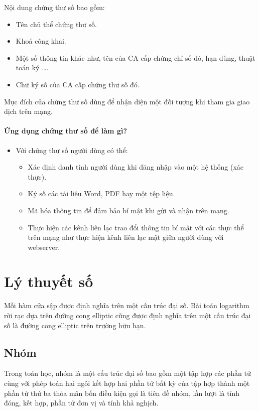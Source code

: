 \documentclass[a4paper,12pt]{report}
\begin{document}
Nội dung chứng thư số bao gồm:
\begin{itemize}
\item Tên chủ thể chứng thư số.
\item Khoá công khai.
\item Một số thông tin khác như, tên của CA cấp chứng chỉ số đó, hạn dùng, thuật toán ký \ldots.
\item Chữ ký số của CA cấp chứng thư số đó.
\end{itemize}

Mục đích của chứng thư số dùng để nhận diện một đối tượng khi tham gia giao dịch trên mạng.

\subsubsection{Ứng dụng chứng thư số để làm gì?}
\begin{itemize}
\item Với chứng thư số người dùng có thể:
\begin{itemize}
\item Xác định danh tính người dùng khi đăng nhập vào một hệ thống (xác thực).
\item Ký số các tài liệu Word, PDF hay một tệp liệu.
\item Mã hóa thông tin để đảm bảo bí mật khi gửi và nhận trên mạng.
\item Thực hiện các kênh liên lạc trao đổi thông tin bí mật với các thực thể trên mạng như thực hiện kênh liên lạc mật giữa người dùng với webserver.
\end{itemize}
\end{itemize}
\chapter{Lý thuyết số}
Mỗi hàm cửa sập được định nghĩa trên một cấu trúc đại số. Bài toán logarithm rời rạc dựa trên đường cong elliptic cũng được định nghĩa trên một cấu trúc đại số là đường cong elliptic trên
trường hữu hạn.
\section{Nhóm}
Trong toán học, nhóm là một cấu trúc đại số bao gồm một tập hợp các phần tử cùng với phép toán hai ngôi kết hợp hai phần tử bất kỳ của tập hợp thành một phần tử thứ ba thỏa mãn bốn điều kiện gọi là tiên đề nhóm, lần lượt là tính đóng, kết hợp, phần tử đơn vị  và tính khả nghịch.
\end{document}
